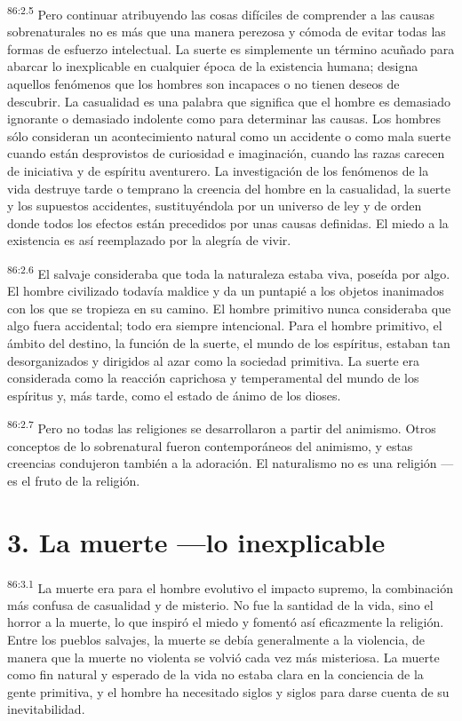 \par
\textsuperscript{86:2.5} Pero continuar atribuyendo las cosas difíciles de comprender a las causas sobrenaturales no es más que una manera perezosa y cómoda de evitar todas las formas de esfuerzo intelectual. La suerte es simplemente un término acuñado para abarcar lo inexplicable en cualquier época de la existencia humana; designa aquellos fenómenos que los hombres son incapaces o no tienen deseos de descubrir. La casualidad es una palabra que significa que el hombre es demasiado ignorante o demasiado indolente como para determinar las causas. Los hombres sólo consideran un acontecimiento natural como un accidente o como mala suerte cuando están desprovistos de curiosidad e imaginación, cuando las razas carecen de iniciativa y de espíritu aventurero. La investigación de los fenómenos de la vida destruye tarde o temprano la creencia del hombre en la casualidad, la suerte y los supuestos accidentes, sustituyéndola por un universo de ley y de orden donde todos los efectos están precedidos por unas causas definidas. El miedo a la existencia es así reemplazado por la alegría de vivir.

\par
\textsuperscript{86:2.6} El salvaje consideraba que toda la naturaleza estaba viva, poseída por algo. El hombre civilizado todavía maldice y da un puntapié a los objetos inanimados con los que se tropieza en su camino. El hombre primitivo nunca consideraba que algo fuera accidental; todo era siempre intencional. Para el hombre primitivo, el ámbito del destino, la función de la suerte, el mundo de los espíritus, estaban tan desorganizados y dirigidos al azar como la sociedad primitiva. La suerte era considerada como la reacción caprichosa y temperamental del mundo de los espíritus y, más tarde, como el estado de ánimo de los dioses.

\par
\textsuperscript{86:2.7} Pero no todas las religiones se desarrollaron a partir del animismo. Otros conceptos de lo sobrenatural fueron contemporáneos del animismo, y estas creencias condujeron también a la adoración. El naturalismo no es una religión ---es el fruto de la religión.

\section*{3. La muerte ---lo inexplicable}
\par
\textsuperscript{86:3.1} La muerte era para el hombre evolutivo el impacto supremo, la combinación más confusa de casualidad y de misterio. No fue la santidad de la vida, sino el horror a la muerte, lo que inspiró el miedo y fomentó así eficazmente la religión. Entre los pueblos salvajes, la muerte se debía generalmente a la violencia, de manera que la muerte no violenta se volvió cada vez más misteriosa. La muerte como fin natural y esperado de la vida no estaba clara en la conciencia de la gente primitiva, y el hombre ha necesitado siglos y siglos para darse cuenta de su inevitabilidad.

